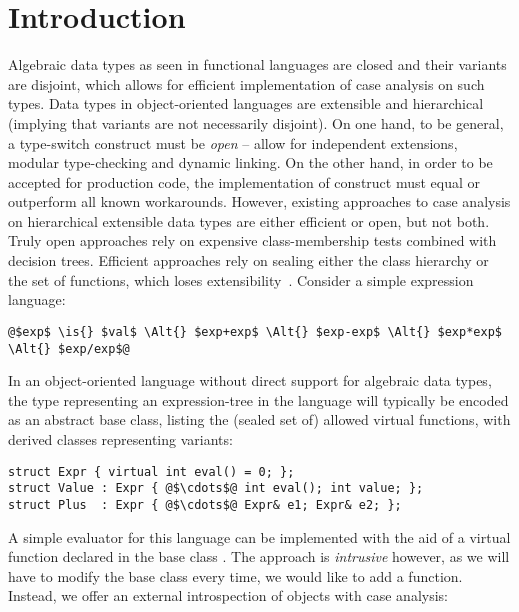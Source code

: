\section{Introduction} %
\label{sec:intro}


Algebraic data types as seen in functional languages are closed and their 
variants are disjoint, which allows for efficient implementation of case analysis 
on such types. Data types in object-oriented languages are extensible
and hierarchical (implying that variants are not necessarily 
disjoint). 
On one hand, to be general, a type-switch construct must be \emph{open} -- 
allow for independent extensions, modular type-checking and dynamic linking. 
On the other hand, in order to be accepted for production code, the implementation of
construct must equal or outperform all known workarounds. However, 
existing approaches to case analysis on hierarchical extensible data types are 
either efficient or open, but not both.
Truly open approaches rely on expensive class-membership tests combined with 
decision trees. Efficient approaches rely on sealing either the class 
hierarchy or the set of functions, which loses 
extensibility~\cite{Cohen91,DesignPatterns1993,Vitek97,PQEncoding}.  
Consider a simple expression language: 

\begin{lstlisting}
@$exp$ \is{} $val$ \Alt{} $exp+exp$ \Alt{} $exp-exp$ \Alt{} $exp*exp$ \Alt{} $exp/exp$@
\end{lstlisting}

\noindent 
In an object-oriented language without direct support for algebraic data types, 
the type representing an expression-tree in the language will typically be 
encoded as an abstract base class, listing the (sealed set of) allowed virtual 
functions, with derived classes representing variants:

\begin{lstlisting}[keepspaces,columns=flexible]
struct Expr { virtual int eval() = 0; };
struct Value : Expr { @$\cdots$@ int eval(); int value; };
struct Plus  : Expr { @$\cdots$@ Expr& e1; Expr& e2; };
\end{lstlisting}

\noindent
A simple evaluator for this language can be implemented with the aid of a
virtual function  declared in the base class . 
The approach is \emph{intrusive} however, as we will have to modify the base class every 
time, we would like to add a function. 
Instead, we offer an external introspection of objects with case analysis:

